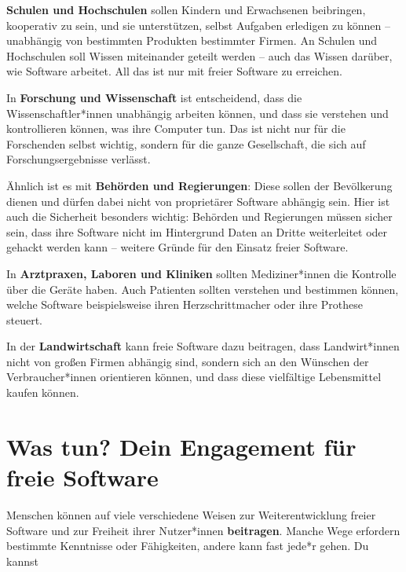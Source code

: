 \documentclass[a5paper,12pt]{scrartcl}
\begin{document}
\textbf{Schulen und Hochschulen} sollen Kindern und Erwachsenen
beibringen, kooperativ zu sein, und sie unterstützen, selbst Aufgaben
erledigen zu können -- unabhängig von bestimmten Produkten bestimmter
Firmen. An Schulen und Hochschulen soll Wissen miteinander geteilt
werden -- auch das Wissen darüber, wie Software arbeitet. All das ist
nur mit freier Software zu erreichen.

In \textbf{Forschung und Wissenschaft} ist entscheidend, dass die
Wissenschaftler*innen unabhängig arbeiten können, und dass sie
verstehen und kontrollieren können, was ihre Computer tun. Das ist
nicht nur für die Forschenden selbst wichtig, sondern für die ganze
Gesellschaft, die sich auf Forschungsergebnisse verlässt.

Ähnlich ist es mit \textbf{Behörden und Regierungen}: Diese sollen der
Bevölkerung dienen und dürfen dabei nicht von proprietärer Software
abhängig sein. Hier ist auch die Sicherheit besonders wichtig:
Behörden und Regierungen müssen sicher sein, dass ihre Software nicht
im Hintergrund Daten an Dritte weiterleitet oder gehackt werden kann
-- weitere Gründe für den Einsatz freier Software.

In \textbf{Arztpraxen, Laboren und Kliniken} sollten Mediziner*innen
die Kontrolle über die Geräte haben. Auch Patienten sollten verstehen
und bestimmen können, welche Software beispielsweise ihren
Herzschrittmacher oder ihre Prothese steuert.

In der \textbf{Landwirtschaft} kann freie Software dazu beitragen,
dass Landwirt*innen nicht von großen Firmen abhängig sind, sondern
sich an den Wünschen der Verbraucher*innen orientieren können, und
dass diese vielfältige Lebensmittel kaufen können.


\section{Was tun? Dein Engagement für freie Software}

Menschen können auf viele verschiedene Weisen zur Weiterentwicklung
freier Software und zur Freiheit ihrer Nutzer*innen
\textbf{beitragen}. Manche Wege erfordern bestimmte Kenntnisse oder
Fähigkeiten, andere kann fast jede*r gehen. Du kannst
\end{document}
